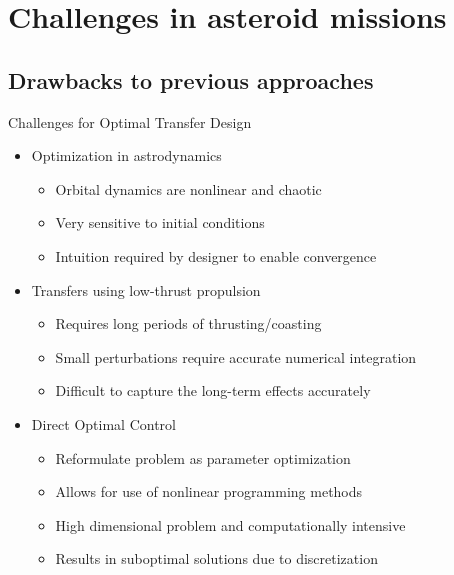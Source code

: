
\section[Challenges]{Challenges in asteroid missions}
\subsection[Previous Approaches]{Drawbacks to previous approaches}

\begin{frame}{Challenges for Optimal Transfer Design} %

\begin{itemize}
    \item Optimization in astrodynamics
        \begin{itemize}
            \item Orbital dynamics are nonlinear and chaotic
            \item Very sensitive to initial conditions
            \item Intuition required by designer to enable convergence
        \end{itemize}
    \pause
    \item Transfers using low-thrust propulsion
        \begin{itemize}
            \item Requires long periods of thrusting/coasting
            \item Small perturbations require accurate numerical integration
            \item Difficult to capture the long-term effects accurately
        \end{itemize}
    \pause
    \item Direct Optimal Control
        \begin{itemize}
            \item Reformulate problem as parameter optimization
            \item Allows for use of nonlinear programming methods
            \item High dimensional problem and computationally intensive
            \item Results in suboptimal solutions due to discretization
        \end{itemize}
\end{itemize}

\end{frame}   %

